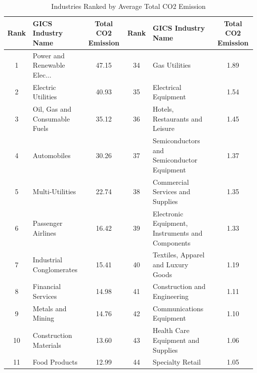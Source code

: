 \documentclass[12pt]{article}
\begin{document}
\begin{landscape}
\begin{table}[!ht]
\scriptsize
\centering
\caption{Industries Ranked by Average Total CO2 Emission}
\label{tab: industries rank}
\begin{tabular}{clcclc}
\toprule
 Rank &                                 GICS Industry Name &  Total CO2 Emission &  Rank &                               GICS Industry Name &  Total CO2 Emission \\
\midrule
   1 & Power and Renewable Elec... &               47.15 &    34 &                                    Gas Utilities &                1.89 \\
    2 &                                 Electric Utilities &               40.93 &    35 &                             Electrical Equipment &                1.54 \\
    3 &                      Oil, Gas and Consumable Fuels &               35.12 &    36 &                  Hotels, Restaurants and Leisure &                1.45 \\
    4 &                                        Automobiles &               30.26 &    37 &       Semiconductors and Semiconductor Equipment &                1.37 \\
    5 &                                    Multi-Utilities &               22.74 &    38 &                 Commercial Services and Supplies &                1.35 \\
    6 &                                 Passenger Airlines &               16.42 &    39 & Electronic Equipment, Instruments and Components &                1.33 \\
    7 &                           Industrial Conglomerates &               15.41 &    40 &               Textiles, Apparel and Luxury Goods &                1.19 \\
    8 &                                 Financial Services &               14.98 &    41 &                     Construction and Engineering &                1.11 \\
    9 &                                  Metals and Mining &               14.76 &    42 &                         Communications Equipment &                1.10 \\
   10 &                             Construction Materials &               13.60 &    43 &               Health Care Equipment and Supplies &                1.06 \\
   11 &                                      Food Products &               12.99 &    44 &                                 Specialty Retail &                1.05 \\

\end{tabular}
\end{table}
\end{landscape}
\end{document}
